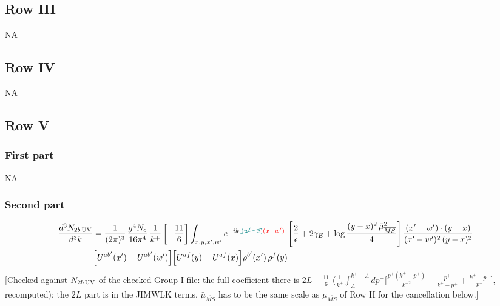 \documentclass[9pt]{article}
\numberwithin{equation}{section}
\begin{document}
\subsection{Row III}
\textsc{NA}
\subsection{Row IV}
\textsc{NA}
\subsection{Row V}
\subsubsection*{First part}
\textsc{NA}
\subsubsection*{Second part}
\begin{align}
\frac{d^{3}N_{2b\,\rm UV}}{d^{3}k}&=\frac{1}{(2\pi)^{3}}\,\frac{g^{4}N_{c}}{16\pi^{4}}\,\frac{1}{k^{+}}\left[-\frac{11}{6}\right]\int_{x,y,x',w'}e^{-ik\cdot{\color{teal}\cancel{(w'-x)}}{\color{red}(x-w')}}\,\left[\frac{2}{\epsilon}+2\gamma_{E}+\log\frac{(y-x)^{2}\,\bar\mu^{2}_{\overline{MS}}}{4}\right]\frac{(x'-w')\cdot(y-x)}{(x'-w')^{2}\,(y-x)^{2}}\notag \\ & \Big[U^{ab'}(x')-U^{ab'}(w')\Big]\Big[U^{af}(y)-U^{af}(x)\Big]\rho^{b'}(x')\,\rho^{f}(y)
\end{align} {\color{red}[Checked against $N_{2b\,\rm UV}$ of the checked Group I file: the full coefficient there is $2L-\frac{11}{6}$ ($\frac{1}{k^{+}}\int_{\Lambda}^{k^{+}-\Lambda}dp^{+}\big[\frac{p^{+}(k^{+}-p^{+})}{k^{+2}}+\frac{p^{+}}{k^{+}-p^{+}}+\frac{k^{+}-p^{+}}{p^{+}}\big]$, recomputed); the $2L$ part is in the JIMWLK terms. $\bar\mu_{\overline{MS}}$ has to be the same scale as $\mu_{\overline{MS}}$ of Row II for the cancellation below.]}\par\noindent  
\end{document}
